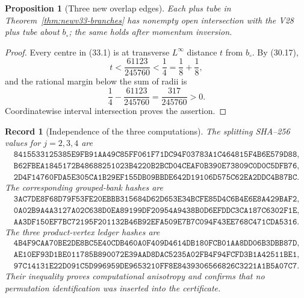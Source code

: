 \documentclass[11pt,oneside]{article}
\newtheorem{proposition}[theorem]{Proposition}
\newtheorem{record}[theorem]{Record}
\theoremstyle{definition}
\theoremstyle{remark}
\begin{document}
\begin{proposition}[Three new overlap edges]
\label{prop:newv33-overlaps}
Each plus tube in Theorem~\ref{thm:newv33-branches} has
nonempty open intersection with the V28 plus tube about
\(b_\circ\); the same holds after momentum inversion.
\end{proposition}

\begin{proof}
Every centre in (33.1) is at transverse \(L^\infty\) distance \(t\)
from \(b_\circ\).  By (30.17),
\[
 t<\frac{61123}{245760}
 <\frac14=\frac18+\frac18,
\]
and the rational margin below the sum of radii is
\[
 \frac14-\frac{61123}{245760}
 =\frac{317}{245760}>0.                                \tag{33.13}
\]
Coordinatewise interval intersection proves the assertion.
\end{proof}

\begin{record}[Independence of the three computations]
\label{rec:newv33-independence}
The splitting SHA--256 values for \(j=2,3,4\) are
\[
\begin{gathered}
\texttt{8415533125385E9FB91AA49C85FF061F71DC94F03783A1C464815F4B6E579D88},\\
\texttt{B62FBEA1845172B48688251023B4220B2BCD04CEAF0B390E73809C0D0C5DFB76},\\
\texttt{2D4F14760FDA5E305CA1B29EF155DB09BBDE642D19106D575C62EA2DDC4B87BC}.
\end{gathered}                                          \tag{33.14}
\]
The corresponding grouped-bank hashes are
\[
\begin{gathered}
\texttt{3AC7DE8F68D79F53FE20EBBB315684D62D653E34BCFE85D4C6B4E6E8A429BAF2},\\
\texttt{0A02B9A4A3127A02C638D0EA89199DF20954A9438B0D6EFDDC3CA187C6302F1E},\\
\texttt{AA3DF150EF7BC72195F201132B46B92EFA509E7B7C094F43EE768C471CDA5316}.
\end{gathered}                                          \tag{33.15}
\]
The three product-vertex ledger hashes are
\[
\begin{gathered}
\texttt{4B4F9CAA70BE2DE8BC5E40CDB460A0F409D4614DB180FCB01AA8DD06B3DBB87D},\\
\texttt{AE10EF93D1BE011785B890072E39AAD8DAC5235A02FB4F94FCFD3B1A42511BE1},\\
\texttt{97C14131E22D091C5D996959DE9653210FF8E8439306566826C3221A1B5A07C7}.
\end{gathered}                                          \tag{33.16}
\]
Their inequality proves computational anisotropy and confirms that
no permutation identification was inserted into the certificate.
\end{record}
\end{document}
